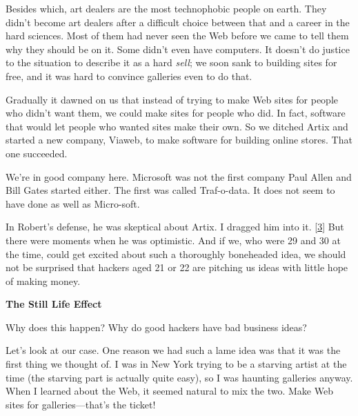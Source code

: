 Besides which, art dealers are the most
                    technophobic people on earth. They didn't become art dealers
                    after a difficult choice between that and a career in the
                    hard sciences. Most of them had never seen the Web before we
                    came to tell them why they should be on it. Some didn't even
                    have computers. It doesn't do justice to the situation to
                    describe it as a hard \emph{sell}; we soon sank to building
                    sites for free, and it was hard to convince galleries even
                    to do that.

Gradually it dawned on us that
                    instead of trying to make Web sites for people who didn't
                    want them, we could make sites for people who did. In fact,
                    software that would let people who wanted sites make their
                    own. So we ditched Artix and started a new company, Viaweb,
                    to make software for building online stores. That one
                    succeeded.

We're in good company here. Microsoft
                    was not the first company Paul Allen and Bill Gates started
                    either. The first was called Traf-o-data.
                    It does not seem to have done as well as Micro-soft.
                    

In
                    Robert's defense, he was skeptical about Artix. I dragged
                    him into it.
                    [\href{\#f3n}{3}]
                    But there were moments when he was optimistic. And if we,
                    who were 29 and 30 at the time, could get excited about such
                    a thoroughly boneheaded idea, we should not be surprised
                    that hackers aged 21 or 22 are pitching us ideas with little
                    hope of making money.

\textbf{The Still Life Effect}

Why does this happen? Why do good hackers have
                    bad business ideas?

Let's look at our case. One
                    reason we had such a lame idea was that it was the first
                    thing we thought of. I was in New York trying to be a
                    starving artist at the time (the starving part is actually
                    quite easy), so I was haunting galleries anyway. When I
                    learned about the Web, it seemed natural to mix the two.
                    Make Web sites for galleries---that's the ticket!

